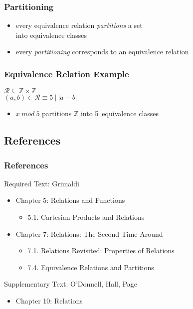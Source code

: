 \documentclass[dvipsnames]{beamer}
\begin{document}
\begin{frame}
  \frametitle{Partitioning}

  \begin{itemize}
    \item every equivalence relation \emph{partitions} a set\\
      into equivalence classes

    \pause
    \medskip
    \item every \emph{partitioning} corresponds to an equivalence relation
  \end{itemize}
\end{frame}

\begin{frame}
  \frametitle{Equivalence Relation Example}

  \begin{example}
    $\mathcal{R} \subseteq \mathbb{Z} \times \mathbb{Z}$\\
    $(a,b) \in \mathcal{R} \equiv 5~|~|a - b|$

    \pause
    \bigskip
    \begin{itemize}
      \item $x~mod~5$ partitions $\mathbb{Z}$ into 5~equivalence classes
    \end{itemize}
  \end{example}
\end{frame}

\subsection*{References}

\begin{frame}
  \frametitle{References}

  \begin{block}{Required Text: Grimaldi}
    \begin{itemize}
      \item Chapter 5: Relations and Functions
      \begin{itemize}
        \item 5.1. \alert{Cartesian Products and Relations}
      \end{itemize}
      \item Chapter 7: Relations: The Second Time Around
      \begin{itemize}
        \item 7.1. \alert{Relations Revisited: Properties of Relations}
        \item 7.4. \alert{Equivalence Relations and Partitions}
      \end{itemize}
    \end{itemize}
  \end{block}

  \begin{block}{Supplementary Text: O'Donnell, Hall, Page}
    \begin{itemize}
      \item Chapter 10: Relations
    \end{itemize}
  \end{block}
\end{frame}
\end{document}
